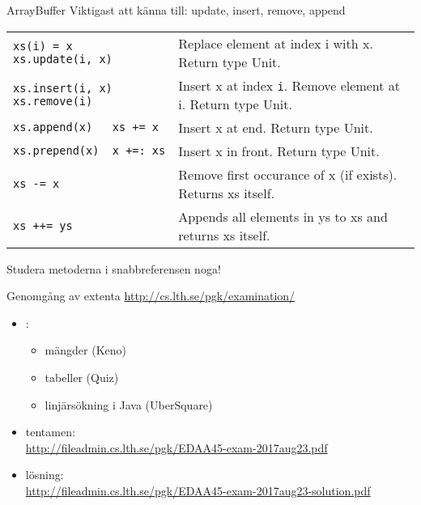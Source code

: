 \begin{Slide}{ArrayBuffer}
Viktigast att känna till: update, insert, remove, append
{\SlideFontTiny

\vspace{2.5em}\begin{tabular}{@{}p{4.2cm}  p{6.5cm}}
\texttt{xs(i) = x \newline xs.update(i, x)} & Replace element at index i with x. \newline Return type Unit.\\   \cline{1-2}

\texttt{xs.insert(i, x)\newline xs.remove(i)} & Insert x at index \texttt{i}. Remove element at i. \newline Return type Unit.\\   \cline{1-2}

\texttt{xs.append(x)~~~xs~+=~x} & Insert x at end.  Return type Unit.\\   \cline{1-2}

\texttt{xs.prepend(x)~~x~+=:~xs} & Insert x in front.  Return type Unit.\\   \cline{1-2}

\texttt{xs -= x} & Remove first occurance of x (if exists). \newline Returns xs itself. \\\cline{1-2}

\texttt{xs ++= ys} & Appends all elements in ys to xs and returns xs itself. \\

\end{tabular}
}

\vspace{2em}Studera metoderna i snabbreferensen noga!
\end{Slide}



\begin{Slide}{Genomgång av extenta}
\url{http://cs.lth.se/pgk/examination/}

\vspace{1em}
\begin{itemize}
\item {}:
\begin{itemize}
  \item mängder (Keno)
  \item tabeller (Quiz)
  \item linjärsökning i Java (UberSquare)
\end{itemize}
\item tentamen:\\ \url{http://fileadmin.cs.lth.se/pgk/EDAA45-exam-2017aug23.pdf}
\item lösning:\\ \url{http://fileadmin.cs.lth.se/pgk/EDAA45-exam-2017aug23-solution.pdf}
\end{itemize}
\end{Slide}



